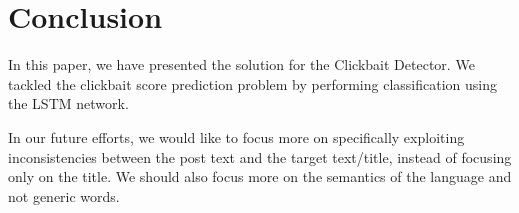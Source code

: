 \section{Conclusion}
In this paper, we have presented the solution for the Clickbait Detector. We tackled the clickbait score prediction problem by performing classification using the LSTM network.

In our future efforts, we would like to focus more on specifically exploiting inconsistencies between the post text and the target text/title, instead of focusing only on the title. 
We should also focus more on the semantics of the language and not generic words.
